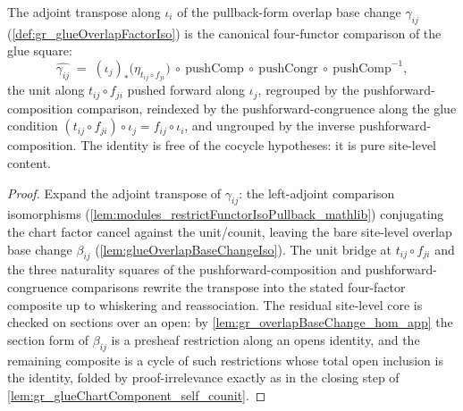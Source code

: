 \begin{lemma}
  \label{lem:gr_glueOverlapFactor_transpose}
  The adjoint transpose along \(\iota_i\) of the pullback-form overlap base change
  \(\gamma_{ij}\) (\cref{def:gr_glueOverlapFactorIso}) is the canonical four-functor
  comparison of the glue square:
  \[
    \widehat{\gamma_{ij}}
      \;=\;
    (\iota_j)_{*}\bigl(\eta_{t_{ij}\circ f_{ji}}\bigr)
      \ \circ\ \mathrm{pushComp}
      \ \circ\ \mathrm{pushCongr}
      \ \circ\ \mathrm{pushComp}^{-1},
  \]
  the unit along \(t_{ij}\circ f_{ji}\) pushed forward along \(\iota_j\), regrouped by
  the pushforward-composition comparison, reindexed by the pushforward-congruence along
  the glue condition \((t_{ij}\circ f_{ji})\circ \iota_j = f_{ij}\circ \iota_i\), and
  ungrouped by the inverse pushforward-composition. The identity is free of the
  cocycle hypotheses: it is pure site-level content.
\end{lemma}
\begin{proof}
    \leanok
  Expand the adjoint transpose of \(\gamma_{ij}\): the left-adjoint comparison
  isomorphisms (\cref{lem:modules_restrictFunctorIsoPullback_mathlib}) conjugating the
  chart factor cancel against the unit/counit, leaving the bare site-level overlap base
  change \(\beta_{ij}\) (\cref{lem:glueOverlapBaseChangeIso}). The unit bridge at
  \(t_{ij}\circ f_{ji}\) and the three naturality squares of the pushforward-composition
  and pushforward-congruence comparisons rewrite the transpose into the stated
  four-factor composite up to whiskering and reassociation. The residual site-level
  core is checked on sections over an open: by \cref{lem:gr_overlapBaseChange_hom_app}
  the section form of \(\beta_{ij}\) is a presheaf restriction along an opens identity,
  and the remaining composite is a cycle of such restrictions whose total open
  inclusion is the identity, folded by proof-irrelevance exactly as in the closing step
  of \cref{lem:gr_glueChartComponent_self_counit}.
\end{proof}

